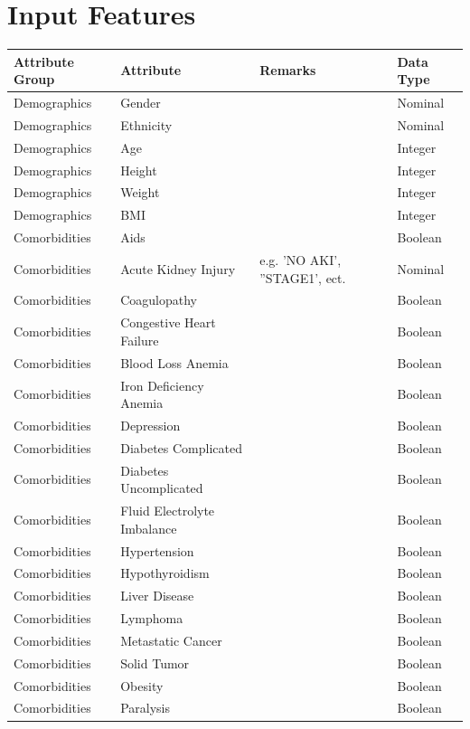 \documentclass[conference,comsoc]{IEEEtran}
\begin{document}
\appendices
\section{Input Features}
\label{app:input}


\begin{longtable}[c]{C{0.2\textwidth} | C{0.2\textwidth} | C{0.4\textwidth} | C{0.2\textwidth}}

\textbf{Attribute Group} & \textbf{Attribute} & \textbf{Remarks} & \textbf{Data Type} \\
\midrule
Demographics & Gender & & Nominal \\
Demographics & Ethnicity & & Nominal \\
Demographics & Age & & Integer \\
Demographics & Height & & Integer \\
Demographics & Weight & & Integer \\
Demographics & BMI & & Integer \\
Comorbidities & Aids & & Boolean \\
Comorbidities & Acute Kidney Injury & e.g. 'NO AKI', ''STAGE1', ect. & Nominal \\
Comorbidities & Coagulopathy & & Boolean \\
Comorbidities & Congestive Heart Failure & & Boolean \\
Comorbidities & Blood Loss Anemia & & Boolean \\
Comorbidities & Iron Deficiency Anemia & & Boolean \\
Comorbidities & Depression & & Boolean \\
Comorbidities & Diabetes Complicated & & Boolean \\
Comorbidities & Diabetes Uncomplicated & & Boolean \\
Comorbidities & Fluid Electrolyte Imbalance     & & Boolean \\
Comorbidities & Hypertension & & Boolean \\
Comorbidities & Hypothyroidism & & Boolean \\
Comorbidities & Liver Disease & & Boolean \\
Comorbidities & Lymphoma & & Boolean \\
Comorbidities & Metastatic Cancer & & Boolean \\
Comorbidities & Solid Tumor & & Boolean \\
Comorbidities & Obesity & & Boolean \\
Comorbidities & Paralysis & & Boolean \\

\end{longtable}
\end{document}
